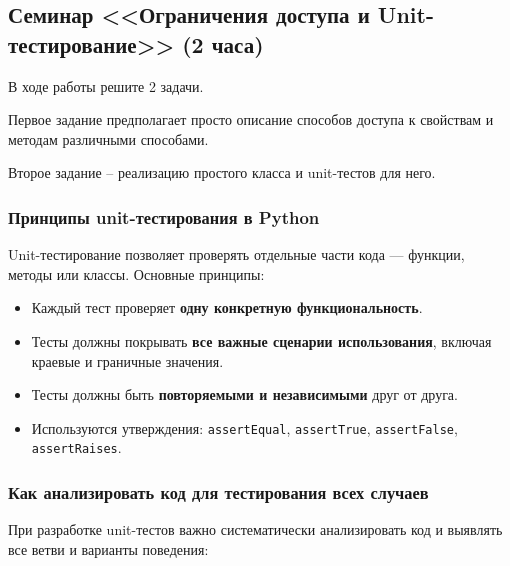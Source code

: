\subsection{Семинар <<Ограничения доступа и Unit-тестирование>>  
(2 часа)}

В ходе работы решите 2 задачи. 

Первое задание предполагает просто описание способов доступа к свойствам и 
методам различными способами.

Второе задание -- реализацию простого класса и unit-тестов для него.

\subsubsection{Принципы unit-тестирования в Python}

Unit-тестирование позволяет проверять отдельные части кода — функции, методы или классы. Основные принципы:

\begin{itemize}
    \item Каждый тест проверяет \textbf{одну конкретную функциональность}.
    \item Тесты должны покрывать \textbf{все важные сценарии использования}, включая краевые и граничные значения.
    \item Тесты должны быть \textbf{повторяемыми и независимыми} друг от друга.
    \item Используются утверждения: \texttt{assertEqual}, \texttt{assertTrue}, \texttt{assertFalse}, \texttt{assertRaises}.
\end{itemize}

\subsubsection{Как анализировать код для тестирования всех случаев}

При разработке unit-тестов важно систематически анализировать код и выявлять все ветви и варианты поведения:

